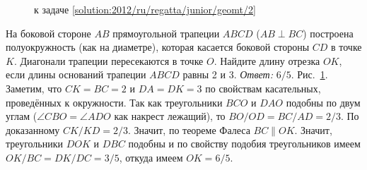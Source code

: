 \ifsolution
\begin{figure}\centering
    \caption{к задаче \ref{solution:2012/ru/regatta/junior/geomt/2}}
    \label{fig:solution:2012/ru/regatta/junior/geomt/2}
\end{figure}
\fi %

\problem
На боковой стороне $AB$ прямоугольной трапеции $ABCD$ ($AB \perp BC$)
построена полуокружность (как на диаметре), которая касается боковой стороны
$CD$ в точке $K$.
Диагонали трапеции пересекаются в точке $O$.
Найдите длину отрезка $OK$, если длины оснований трапеции $ABCD$ равны 2 и 3.
\solution
\label{solution:2012/ru/regatta/junior/geomt/2}%
\emph{Ответ:} $6 / 5$.
Рис.~\ref{fig:solution:2012/ru/regatta/junior/geomt/2}.
Заметим, что $CK = BC = 2$ и $DA = DK = 3$ по свойствам касательных,
проведённых к окружности.
Так как треугольники $BCO$ и $DAO$ подобны по двум углам
($\angle CBO = \angle ADO$ как накрест лежащий),
то $BO / OD = BC / AD = 2 / 3$.
По доказанному $CK / KD = 2 / 3$.
Значит, по теореме Фалеса $BC \parallel OK$.
Значит, треугольники $DOK$ и $DBC$ подобны и по свойству подобия треугольников
имеем $OK / BC = DK / DC = 3 / 5$, откуда имеем $OK = 6 / 5$.
\endproblem
